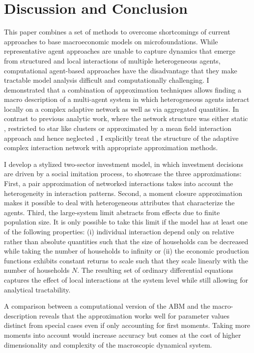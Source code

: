 \section{Discussion and Conclusion}

This paper combines a set of methods to overcome shortcomings of current approaches to base macroeconomic models on microfoundations.
While representative agent approaches are unable to capture dynamics that emerge from structured and local interactions of multiple heterogeneous agents, computational agent-based approaches have the disadvantage that they make tractable model analysis difficult and computationally challenging.
I demonstrated that a combination of approximation techniques allows finding a macro description of a multi-agent system in which heterogeneous agents interact locally on a complex adaptive network as well as via aggregated quantities. 
In contrast to previous analytic work, where the network structure was either static \cite{Lux2016}, restricted to star like clusters \cite{DiGuilmi2012} or approximated by a mean field interaction approach and hence neglected \cite{Aoki1998, Aoki2007, Alfarano2008a, DiGuilmi2008, Chiarella2011a}, I explicitly treat the structure of the adaptive complex interaction network with appropriate approximation methods.

I develop a stylized two-sector investment model, in which investment decisions are driven by a social imitation process, to showcase the three approximations:
First, a pair approximation of networked interactions takes into account the heterogeneity in interaction patterns.
Second, a moment closure approximation makes it possible to deal with heterogeneous attributes that characterize the agents.
Third, the large-system limit abstracts from effects due to finite population size.
It is only possible to take this limit if the model has at least one of the following properties: (i) individual interaction depend only on relative rather than absolute quantities such that the size of households can be decreased while taking the number of households to infinity or (ii) the economic production functions exhibits constant returns to scale such that they scale linearly with the number of households $N$.
The resulting set of ordinary differential equations captures the effect of local interactions at the system level while still allowing for analytical tractability.

A comparison between a computational version of the ABM and the macro-description reveals that the approximation works well for parameter values distinct from special cases even if only accounting for first moments. Taking more moments into account would increase accuracy but comes at the cost of higher dimensionality and complexity of the macroscopic dynamical system.

